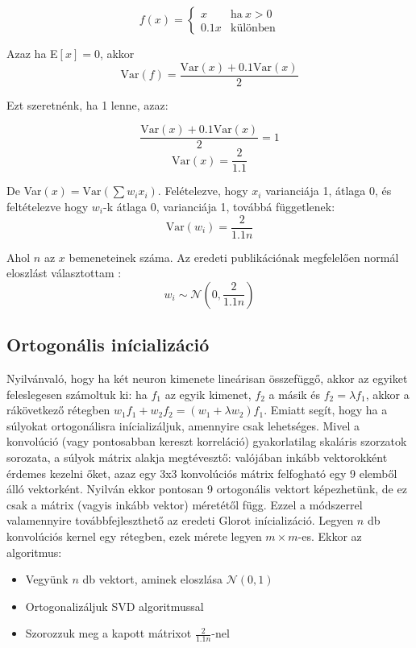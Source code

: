 \documentclass{article}
\newcommand\ddfrac[2]{\frac{\displaystyle #1}{\displaystyle #2}}
\begin{document}
\begin{equation}
    f(x) = \left\{
        \begin{array}{ll}
            x       & \text{ha}\ x > 0 \\
            0.1x    & \text{különben}
        \end{array}
    \right.
\end{equation}

Azaz ha E$[x] = 0$, akkor
\begin{equation}
    \text{Var}(f) = \ddfrac{\text{Var}(x) + 0.1\text{Var}(x)}{2}
\end{equation}

Ezt szeretnénk, ha 1 lenne, azaz:

\begin{equation*}
    \ddfrac{\text{Var}(x) + 0.1\text{Var}(x)}{2} = 1
\end{equation*}
\begin{equation*}
    \text{Var}(x) = \ddfrac{2}{1.1}
\end{equation*}

De Var$(x) = \text{Var}(\sum w_i x_i)$. Felételezve, hogy $x_i$ varianciája 1, átlaga 0, és feltételezve hogy $w_i$-k átlaga 0, varianciája 1, továbbá függetlenek:
\begin{equation*}
    \text{Var}(w_i) = \ddfrac{2}{1.1n}
\end{equation*}

Ahol $n$ az $x$ bemeneteinek száma. Az eredeti publikációnak megfelelően normál eloszlást választottam \cite{glorot2010understanding}:
\begin{equation*}
    w_i \sim \mathcal{N}(0, \frac{2}{1.1n})
\end{equation*}

\subsection{Ortogonális inícializáció}

Nyilvánvaló, hogy ha két neuron kimenete lineárisan összefüggő, akkor az egyiket feleslegesen számoltuk ki: ha $f_1$ az egyik kimenet, $f_2$ a másik és $f_2 = \lambda f_1$, akkor a rákövetkező rétegben $w_1 f_1 + w_2 f_2 = (w_1 + \lambda w_2)f_1$. Emiatt segít, hogy ha a súlyokat ortogonálisra inícializáljuk, amennyire csak lehetséges. Mivel a konvolúció (vagy pontosabban kereszt korreláció) gyakorlatilag skaláris szorzatok sorozata, a súlyok mátrix alakja megtévesztő: valójában inkább vektorokként érdemes kezelni őket, azaz egy 3x3 konvolúciós mátrix felfogható egy 9 elemből álló vektorként. Nyilván ekkor pontosan 9 ortogonális vektort képezhetünk, de ez csak a mátrix (vagyis inkább vektor) méretétől függ. Ezzel a módszerrel valamennyire továbbfejleszthető az eredeti Glorot inícializáció. Legyen $n$ db konvolúciós kernel egy rétegben, ezek mérete legyen $m \times m$-es. Ekkor az algoritmus:
\begin{itemize}
    \item Vegyünk $n$ db vektort, aminek eloszlása $\mathcal{N}(0, 1)$
    \item Ortogonalizáljuk SVD algoritmussal
    \item Szorozzuk meg a kapott mátrixot $\frac{2}{1.1n}$-nel
\end{itemize}
\end{document}
